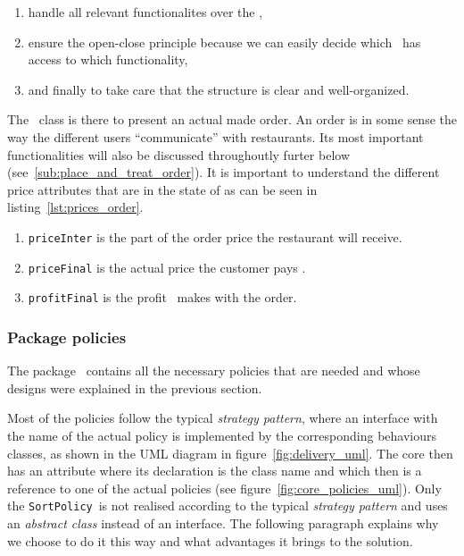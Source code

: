 \begin{enumerate}
	\item handle all relevant functionalites over the \Core,
	\item ensure the open-close principle because we can easily decide
  which \User~has access to which functionality,
	\item and finally to take care that the structure is clear and well-organized.
\end{enumerate}

The \Order~class is there to present an actual made order.
An order is in some sense the way the different users ``communicate'' with restaurants.
Its most important functionalities will also be discussed throughoutly 
furter below (see~\ref{sub:place_and_treat_order}).
It is important to understand the different price attributes that are in 
the state of \Order as can be seen in listing~\ref{lst:prices_order}.

\begin{enumerate}
	\item \lstinline|priceInter| is the part of the order price the restaurant will receive.
	\item \lstinline|priceFinal| is the actual price the customer pays \MyFoodora.
	\item \lstinline|profitFinal| is the profit \MyFoodora~makes with the order. 
\end{enumerate}


\subsubsection{Package policies} %
\label{ssub:policies}

The package \policies~contains all the necessary policies that are needed
and whose designs were explained in the previous section.

Most of the policies follow the typical \emph{strategy pattern},
where an interface with the name of the actual policy is implemented by the corresponding
behaviours classes, as shown in the UML diagram in figure~\ref{fig:delivery_uml}.
The core then has an attribute where its declaration is the class name
and which then is a reference to one of the actual policies (see 
figure~\ref{fig:core_policies_uml}). 
Only the \lstinline|SortPolicy|~is not realised according to
the typical \emph{strategy pattern}
and uses an \emph{abstract class} instead of an interface.
The following paragraph explains why we choose to do it this way
and what advantages it brings to the solution.

